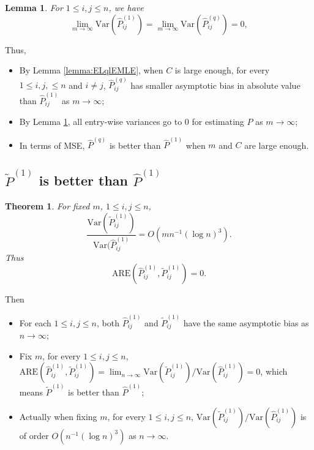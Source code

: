 \documentclass[a4paper]{article}
\newtheorem{lemma}[fact]{Lemma}
\newtheorem{theorem}[fact]{Theorem}
\begin{document}
\begin{lemma}
\label{lemma:VarMLEandLq0}
For $1 \le i, j \le n$, we have
\[
	\lim_{m \to \infty} \mathrm{Var}(\hat{P}^{(1)}_{ij})
    = \lim_{m \to \infty} \mathrm{Var}(\hat{P}^{(q)}_{ij}) = 0,
\]
\end{lemma}
Thus,
\begin{itemize}
\item By Lemma \ref{lemma:ELqlEMLE}, when $C$ is large enough, for every $1 \le i, j, \le n$ and $i \ne j$, $\hat{P}_{ij}^{(q)}$ has smaller asymptotic bias in absolute value than $\hat{P}_{ij}^{(1)}$ as $m \to \infty$;
\item By Lemma \ref{lemma:VarMLEandLq0}, all entry-wise variances go to 0 for estimating $P$ as $m \to \infty$;
\item In terms of MSE, $\hat{P}^{(q)}$ is better than $\hat{P}^{(1)}$ when $m$ and $C$ are large enough.
\end{itemize}






\subsection{$\widetilde{P}^{(1)}$ is better than $\hat{P}^{(1)}$}
\begin{theorem}
\label{thm:AREL1}
For fixed $m$, $1 \le i, j \le n$,
\[
	\frac{\mathrm{Var}(\widetilde{P}_{ij}^{(1)})}{\mathrm{Var}(\hat{P}_{ij}^{(1)}}
    = O(m n^{-1} (\log n)^3).
\]
Thus
\[
	\mathrm{ARE}(\hat{P}_{ij}^{(1)}, \widetilde{P}_{ij}^{(1)}) = 0.
\]
\end{theorem}














Then
\begin{itemize}
	\item For each $1 \le i, j \le n$, both $\hat{P}_{ij}^{(1)}$ and $\widetilde{P}_{ij}^{(1)}$ have the same asymptotic bias as $n \to \infty$;
    \item Fix $m$, for every $1 \le i,j \le n$, $\mathrm{ARE}(\hat{P}_{ij}^{(1)}, \widetilde{P}_{ij}^{(1)}) = \lim_{n \to \infty} \mathrm{Var}(\widetilde{P}_{ij}^{(1)})/\mathrm{Var}(\hat{P}_{ij}^{(1)}) = 0$, which means $\widetilde{P}^{(1)}$ is better than $\hat{P}^{(1)}$;
    \item Actually when fixing $m$, for every $1 \le i,j \le n$, $\mathrm{Var}(\widetilde{P}_{ij}^{(1)})/\mathrm{Var}(\hat{P}_{ij}^{(1)})$ is of order $O(n^{-1} (\log n)^3)$ as $n \to \infty$.
\end{itemize}
\end{document}
